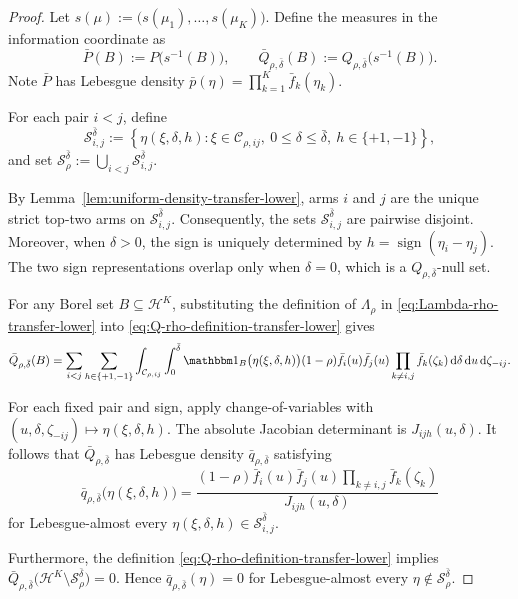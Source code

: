 \documentclass[10pt]{article}
\newcommand{\dd}{\mathrm{d}}
\theoremstyle{plain}
\begin{document}
\begin{proof}

Let
    $s(\mu)
    := \bigl(s(\mu_1),\ldots,s(\mu_K)\bigr)$. Define the measures in the information coordinate as
\[
    \bar P(B)
    :=
    P\bigl(s^{-1}(B)\bigr),
    \qquad
    \bar Q_{\rho,\bar\delta}(B)
    :=
    Q_{\rho,\bar\delta}\bigl(s^{-1}(B)\bigr).
\]
Note $\bar P$ has Lebesgue density
    $\bar p(\eta)
    =
    \prod_{k=1}^K\bar f_k(\eta_k)$.


For each pair $i<j$, define
\[
    \mathcal S_{i,j}^{\bar\delta}
    :=
    \left\{
        \eta(\xi,\delta,h):
        \xi\in\mathcal C_{\rho,ij},\
        0\le\delta\le\bar\delta,\
        h\in\{+1,-1\}
    \right\},
\]
and set
$\mathcal S_\rho^{\bar\delta}:=
\bigcup_{i<j}\mathcal S_{i,j}^{\bar\delta}$.

By Lemma~\ref{lem:uniform-density-transfer-lower}, arms $i$ and $j$ are
the unique strict top-two arms on $\mathcal S_{i,j}^{\bar\delta}$.
Consequently, the sets $\mathcal S_{i,j}^{\bar\delta}$ are pairwise
disjoint. Moreover, when $\delta>0$, the sign is uniquely determined by
$h=\operatorname{sign}(\eta_i-\eta_j)$. The two sign representations
overlap only when $\delta=0$, which is a
$Q_{\rho,\bar\delta}$-null set.

For any Borel set $B\subseteq\mathcal H^K$, substituting the definition
of $\Lambda_\rho$ in \eqref{eq:Lambda-rho-transfer-lower} into
\eqref{eq:Q-rho-definition-transfer-lower} gives
\[
\begin{aligned}
    \bar Q_{\rho,\bar\delta}(B)
    =
    \sum_{i<j}\sum_{h\in\{+1,-1\}}
    \int_{\mathcal C_{\rho,ij}}
    \int_0^{\bar\delta}
    \mathbbm 1_B\bigl(\eta(\xi,\delta,h)\bigr)
    (1-\rho)\bar f_i(u)\bar f_j(u)
    \prod_{k\neq i,j}\bar f_k(\zeta_k)
    \,\dd\delta\,\dd u\,\dd\zeta_{-ij}.
\end{aligned}
\]

For each fixed pair and sign, apply change-of-variables with 
    $(u,\delta,\zeta_{-ij})
    \longmapsto
    \eta(\xi,\delta,h)$.
The absolute Jacobian determinant is $J_{ijh}(u,\delta)$. It follows that
$\bar Q_{\rho,\bar\delta}$ has Lebesgue density
$\bar q_{\rho,\bar\delta}$ satisfying
\[
    \bar q_{\rho,\bar\delta}
    \bigl(\eta(\xi,\delta,h)\bigr)
    =
    \frac{
        (1-\rho)\bar f_i(u)\bar f_j(u)
        \displaystyle\prod_{k\neq i,j}\bar f_k(\zeta_k)
    }{
        J_{ijh}(u,\delta)
    }
\]
for Lebesgue-almost every
$\eta(\xi,\delta,h)\in\mathcal S_{i,j}^{\bar\delta}$.

Furthermore, the definition
\eqref{eq:Q-rho-definition-transfer-lower} implies
    $\bar Q_{\rho,\bar\delta}
    \bigl(
        \mathcal H^K\setminus
        \mathcal S_\rho^{\bar\delta}
    \bigr)
    =
    0$.
Hence
$\bar q_{\rho,\bar\delta}(\eta)=0$ for Lebesgue-almost every
$\eta\notin\mathcal S_\rho^{\bar\delta}$.


\end{proof}
\end{document}
